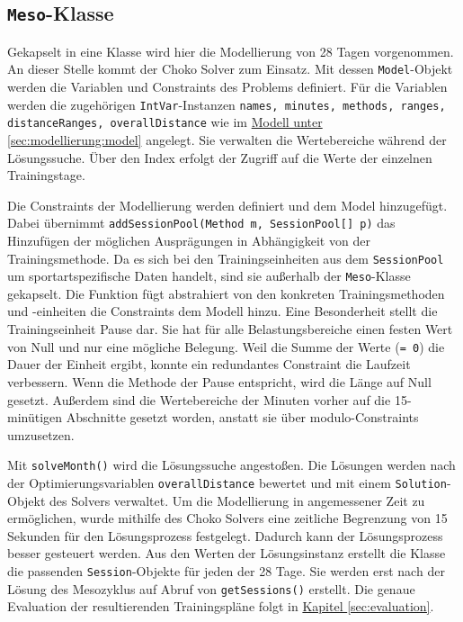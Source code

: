 \subsection{\texttt{Meso}-Klasse}
Gekapselt in eine Klasse wird hier die Modellierung von 28 Tagen vorgenommen. An dieser Stelle kommt der Choko Solver zum Einsatz. Mit dessen \texttt{Model}-Objekt werden die Variablen und Constraints des Problems definiert. Für die Variablen werden die zugehörigen \texttt{IntVar}-Instanzen \texttt{names, minutes, methods, ranges, distanceRanges, overallDistance} wie im \hyperref[sec:modellierung:model]{Modell unter \ref{sec:modellierung:model}} angelegt. Sie verwalten die Wertebereiche während der Lösungssuche. Über den Index erfolgt der Zugriff auf die Werte der einzelnen Trainingstage. \par
Die Constraints der Modellierung werden definiert und dem Model hinzugefügt. Dabei übernimmt \texttt{addSessionPool(Method m, SessionPool[] p)} das Hinzufügen der möglichen Ausprägungen in Abhängigkeit von der Trainingsmethode. Da es sich bei den Trainingseinheiten aus dem \texttt{SessionPool} um sportartspezifische Daten handelt, sind sie außerhalb der \texttt{Meso}-Klasse gekapselt. Die Funktion fügt abstrahiert von den konkreten Trainingsmethoden und -einheiten die Constraints dem Modell hinzu. \newline
Eine Besonderheit stellt die Trainingseinheit Pause dar. Sie hat für alle Belastungsbereiche einen festen Wert von Null und nur eine mögliche Belegung. Weil die Summe der Werte (\texttt{= 0}) die Dauer der Einheit ergibt, konnte ein redundantes Constraint die Laufzeit verbessern. Wenn die Methode der Pause entspricht, wird die Länge auf Null gesetzt. \newline
Außerdem sind die Wertebereiche der Minuten vorher auf die 15-minütigen Abschnitte gesetzt worden, anstatt sie über modulo-Constraints umzusetzen.\par
Mit \texttt{solveMonth()} wird die Lösungssuche angestoßen. Die Lösungen werden nach der Optimierungsvariablen \texttt{overallDistance} bewertet und mit einem \texttt{Solution}-Objekt des Solvers verwaltet. Um die Modellierung in angemessener Zeit zu ermöglichen, wurde mithilfe des Choko Solvers eine zeitliche Begrenzung von 15 Sekunden für den Lösungsprozess festgelegt. Dadurch kann der Lösungsprozess besser gesteuert werden. Aus den Werten der Lösungsinstanz erstellt die Klasse die passenden \texttt{Session}-Objekte für jeden der 28 Tage. Sie werden erst nach der Lösung des Mesozyklus auf Abruf von \texttt{getSessions()} erstellt. Die genaue Evaluation der resultierenden Trainingspläne folgt in \hyperref[sec:evaluation]{Kapitel \ref{sec:evaluation}}.

